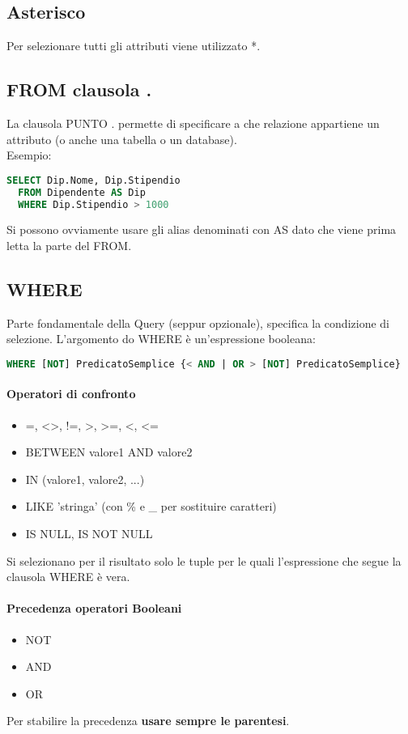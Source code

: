 \subsection{Asterisco}
Per selezionare tutti gli attributi viene utilizzato *.
\subsection{FROM clausola .}
La clausola PUNTO . permette di specificare a che relazione
appartiene un attributo (o anche una tabella o un database).\\
Esempio:
\begin{lstlisting}[language=SQL]
  SELECT Dip.Nome, Dip.Stipendio
  FROM Dipendente AS Dip
  WHERE Dip.Stipendio > 1000
\end{lstlisting}
Si possono ovviamente usare gli alias denominati con AS dato che
viene prima letta la parte del FROM.\\
\subsection{WHERE}
Parte fondamentale della Query (seppur opzionale), specifica la
condizione di selezione. L'argomento do WHERE è un'espressione booleana:\\
\begin{lstlisting}[language=SQL]
  WHERE [NOT] PredicatoSemplice {< AND | OR > [NOT] PredicatoSemplice}
\end{lstlisting}
\paragraph*{Operatori di confronto}
\begin{itemize}
  \item =, <>, !=, >, >=, <, <=
  \item BETWEEN valore1 AND valore2
  \item IN (valore1, valore2, ...)
  \item LIKE 'stringa' (con \% e \_ per sostituire caratteri)
  \item IS NULL, IS NOT NULL
\end{itemize}
Si selezionano per il risultato solo le tuple per le quali l'espressione
che segue la clausola WHERE è vera.\\
\paragraph*{Precedenza operatori Booleani}
\begin{itemize}
  \item NOT
  \item AND
  \item OR
\end{itemize}
Per stabilire la precedenza \textbf{usare sempre le parentesi}.\\
